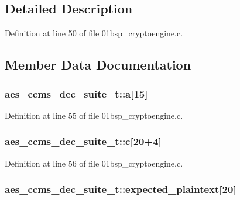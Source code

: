 \subsection{Detailed Description}


Definition at line 50 of file 01bsp\+\_\+cryptoengine.\+c.



\subsection{Member Data Documentation}
\subsubsection[{\texorpdfstring{a}{a}}]{ aes\+\_\+ccms\+\_\+dec\+\_\+suite\+\_\+t\+::a\mbox{[}15\mbox{]}}\hypertarget{structaes__ccms__dec__suite__t_ab6c4c1e4aaea5736d42808691efbe6d4}{}\label{structaes__ccms__dec__suite__t_ab6c4c1e4aaea5736d42808691efbe6d4}


Definition at line 55 of file 01bsp\+\_\+cryptoengine.\+c.

\subsubsection[{\texorpdfstring{c}{c}}]{ aes\+\_\+ccms\+\_\+dec\+\_\+suite\+\_\+t\+::c\mbox{[}20+4\mbox{]}}\hypertarget{structaes__ccms__dec__suite__t_a954d31fc94cf3c67153c2a7fe0f9f6b9}{}\label{structaes__ccms__dec__suite__t_a954d31fc94cf3c67153c2a7fe0f9f6b9}


Definition at line 56 of file 01bsp\+\_\+cryptoengine.\+c.

\subsubsection[{\texorpdfstring{expected\+\_\+plaintext}{expected_plaintext}}]{ aes\+\_\+ccms\+\_\+dec\+\_\+suite\+\_\+t\+::expected\+\_\+plaintext\mbox{[}20\mbox{]}}\hypertarget{structaes__ccms__dec__suite__t_aa69d8cfeaaa1d5eb76953650eb4a96ea}{}\label{structaes__ccms__dec__suite__t_aa69d8cfeaaa1d5eb76953650eb4a96ea}


